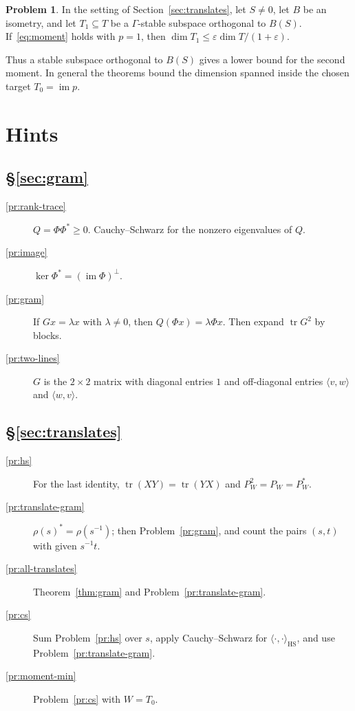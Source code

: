 \documentclass[reqno]{amsart}
\numberwithin{equation}{section}
\theoremstyle{definition}
\newtheorem{problem}{Problem}[section]
\theoremstyle{plain}
\theoremstyle{remark}
\newcommand{\tr}{\operatorname{tr}}
\newcommand{\im}{\operatorname{im}}
\newcommand{\HS}{\mathrm{HS}}
\begin{document}
\begin{problem}\label{pr:missed}
In the setting of Section~\ref{sec:translates}, let \(S \ne 0\), let \(B\) be an isometry, and let \(T_1 \subseteq T\) be a \(\Gamma\)-stable subspace orthogonal to \(B(S)\).  If~\eqref{eq:moment} holds with \(p = 1\), then \(\dim T_1 \le \varepsilon\dim T/(1 + \varepsilon)\).
\end{problem}

Thus a stable subspace orthogonal to \(B(S)\) gives a lower bound for the second moment.  In general the theorems bound the dimension spanned inside the chosen target \(T_0=\im p\).

\section*{Hints}

\subsection*{\S\ref{sec:gram}}
\begin{description}
\item[\ref{pr:rank-trace}] \(Q = \Phi\Phi^* \ge 0\).  Cauchy--Schwarz for the nonzero eigenvalues of \(Q\).
\item[\ref{pr:image}] \(\ker \Phi^* = (\im \Phi)^\perp\).
\item[\ref{pr:gram}] If \(Gx = \lambda x\) with \(\lambda \ne 0\), then \(Q(\Phi x) = \lambda \Phi x\).  Then expand \(\tr G^2\) by blocks.
\item[\ref{pr:two-lines}] \(G\) is the \(2 \times 2\) matrix with diagonal entries \(1\) and off-diagonal entries \(\langle v, w \rangle\) and \(\langle w, v \rangle\).
\end{description}

\subsection*{\S\ref{sec:translates}}
\begin{description}
\item[\ref{pr:hs}] For the last identity, \(\tr(XY) = \tr(YX)\) and \(P_W^2 = P_W = P_W^*\).
\item[\ref{pr:translate-gram}] \(\rho(s)^* = \rho(s^{-1})\); then Problem~\ref{pr:gram}, and count the pairs \((s, t)\) with given \(s^{-1}t\).
\item[\ref{pr:all-translates}] Theorem~\ref{thm:gram} and Problem~\ref{pr:translate-gram}.
\item[\ref{pr:cs}] Sum Problem~\ref{pr:hs} over \(s\), apply Cauchy--Schwarz for \(\langle\cdot,\cdot\rangle_\HS\), and use Problem~\ref{pr:translate-gram}.
\item[\ref{pr:moment-min}] Problem~\ref{pr:cs} with \(W = T_0\).
\end{description}
\end{document}
